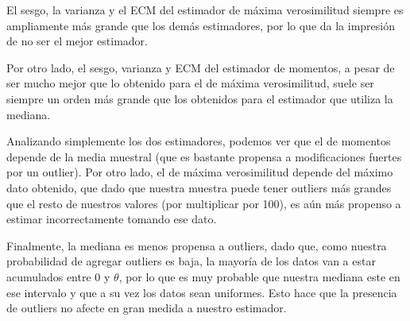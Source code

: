 \documentclass[a4paper]{article}
\begin{document}
El sesgo, la varianza y el ECM del estimador de máxima verosimilitud siempre es ampliamente más grande que los demás estimadores, por lo que da la impresión de no ser el mejor estimador. 

Por otro lado, el sesgo, varianza y ECM del estimador de momentos, a pesar de ser mucho mejor que lo obtenido para el de máxima verosimilitud, suele ser siempre un orden más grande que los obtenidos para el estimador que utiliza la mediana. 

Analizando simplemente los dos estimadores, podemos ver que el de momentos depende de la media muestral (que es bastante propensa a modificaciones fuertes por un outlier). Por otro lado, el de máxima verosimilitud depende del máximo dato obtenido, que dado que nuestra muestra puede tener outliers más grandes que el resto de nuestros valores (por multiplicar por 100), es aún más propenso a estimar incorrectamente tomando ese dato. 

Finalmente, la mediana es menos propensa a outliers, dado que, como nuestra probabilidad de agregar outliers es baja, la mayoría de los datos van a estar acumulados entre $0$ y $\theta$, por lo que es muy probable que nuestra mediana este en ese intervalo y que a su vez los datos sean uniformes. Esto hace que la presencia de outliers no afecte en gran medida a nuestro estimador. 


\end{document}
